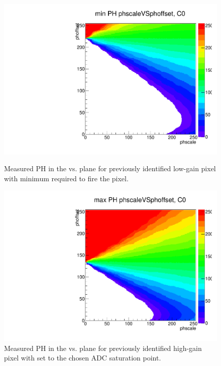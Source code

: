 
\begin{figure}[!htp]
\centering
\begin{minipage}{0.45\textwidth}
  \includegraphics[width=1.0\textwidth]{figures/phopt_minphvsdacdac_th2.pdf}
  \caption{Measured PH in the \phoffset vs. \phscale plane for previously identified low-gain pixel
           with minimum \vcal required to fire the pixel.}
  \label{fig:phopt_minphvsdacdac_th2}
\end{minipage}
\hspace{0.3cm}
\begin{minipage}{0.45\textwidth}
  \includegraphics[width=1.0\textwidth]{figures/phopt_maxphvsdacdac_th2.pdf}
  \caption{Measured PH in the \phoffset vs. \phscale plane for previously identified high-gain pixel
           with \vcal set to the chosen ADC saturation point.}
  \label{fig:phopt_maxphvsdacdac_th2}
\end{minipage}
\end{figure}

